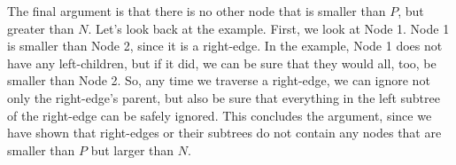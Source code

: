 \begin{blocksection}
\begin{solution}[2.5in]
The final argument is that there is no other node that is smaller than $P$, but greater than $N$. Let's look back at the example. First, we look at Node 1. Node 1 is smaller than Node 2, since it is a right-edge. In the example, Node 1 does not have any left-children, but if it did, we can be sure that they would all, too, be smaller than Node 2. So, any time we traverse a right-edge, we can ignore not only the right-edge's parent, but also be sure that everything in the left subtree of the right-edge can be safely ignored. This concludes the argument, since we have shown that right-edges or their subtrees do not contain any nodes that are smaller than $P$ but larger than $N$. 

\end{solution}
\end{blocksection}
